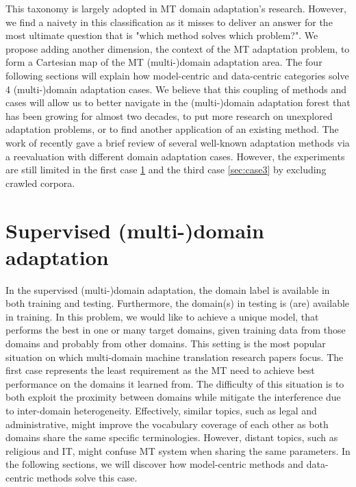 This taxonomy is largely adopted in MT domain adaptation's research. However, we find a naivety in this classification as it misses to deliver an answer for the most ultimate question that is "which method solves which problem?". We propose adding another dimension, the context of the MT adaptation problem, to form a Cartesian map of the MT (multi-)domain adaptation area. The four following sections will explain how model-centric and data-centric categories solve 4 (multi-)domain adaptation cases. We believe that this coupling of methods and cases will allow us to better navigate in the (multi-)domain adaptation forest that has been growing for almost two decades, to put more research on unexplored adaptation problems, or to find another application of an existing method. The work of \citet{Pham21revisiting} recently gave a brief review of several well-known adaptation methods via a reevaluation with different domain adaptation cases. However, the experiments are still limited in the first case \ref{sec:case1} and the third case \ref{sec:case3} by excluding crawled corpora.

\section{Supervised (multi-)domain adaptation}
\label{sec:case1}
In the supervised (multi-)domain adaptation, the domain label is available in both training and testing. Furthermore, the domain(s) in testing is (are) available in training. In this problem, we would like to achieve a unique model, that performs the best in one or many target domains, given training data from those domains and probably from other domains. This setting is the most popular situation on which multi-domain machine translation research papers focus. The first case represents the least requirement as the MT need to achieve best performance on the domains it learned from. The difficulty of this situation is to both exploit the proximity between domains while mitigate the interference due to inter-domain heterogeneity. Effectively, similar topics, such as legal and administrative, might improve the vocabulary coverage of each other as both domains share the same specific terminologies. However, distant topics, such as religious and IT, might confuse MT system when sharing the same parameters. In the following sections, we will discover how model-centric methods and data-centric methods solve this case.
